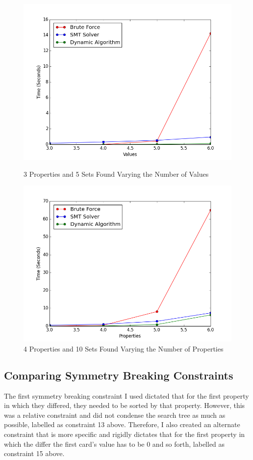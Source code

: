 \documentclass[pageno]{jpaper}
\begin{document}
\begin{figure}[htbb]
\begin{minipage}[b]{0.5\linewidth}
\centering
\includegraphics[width=.75\linewidth]{BADBRUTEVAL-v3456p3n5.png}
\caption{3 Properties and 5 Sets Found Varying the Number of Values}
\label{fig:bruteVal}
\end{minipage}
\hspace{0.5cm}
\begin{minipage}[b]{0.5\linewidth}
\centering
\includegraphics[width=.75\linewidth]{BADBRUTEPROP-v4p3456n10.png}
\caption{4 Properties and 10 Sets Found Varying the Number of Properties}
\label{fig:bruteProp}
\end{minipage}
\end{figure}



\subsection{Comparing Symmetry Breaking Constraints}

The first symmetry breaking constraint I used dictated that for the first property in which they differed, they needed to be sorted by that property. However, this was a relative constraint and did not condense the search tree as much as possible, labelled as constraint 13 above. Therefore, I also created an alternate constraint that is more specific and rigidly dictates that for the first property in which the differ the first card's value has to be 0 and so forth, labelled as constraint 15 above. 
\end{document}
